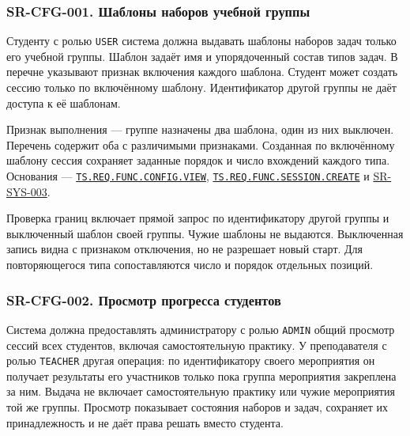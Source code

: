 \documentclass[12pt,a4paper]{article}
\begin{document}
\subsubsection{SR-CFG-001. Шаблоны наборов учебной группы}\label{sr-cfg-001-ux448ux430ux431ux43bux43eux43dux44b-ux43dux430ux431ux43eux440ux43eux432-ux443ux447ux435ux431ux43dux43eux439-ux433ux440ux443ux43fux43fux44b}

\hypertarget{sr-cfg-001-шаблоны-наборов-учебной-группы}{}

\hypertarget{sr-cfg-001}{}

Студенту с ролью \texttt{USER} система должна выдавать шаблоны наборов задач только его учебной группы. Шаблон задаёт имя и упорядоченный состав типов задач. В перечне указывают признак включения каждого шаблона. Студент может создать сессию только по включённому шаблону. Идентификатор другой группы не даёт доступа к её шаблонам.

Признак выполнения --- группе назначены два шаблона, один из них выключен. Перечень содержит оба с различимыми признаками. Созданная по включённому шаблону сессия сохраняет заданные порядок и число вхождений каждого типа. Основания --- {\href{../02\_Техническое\_задание/DOC-02\_Техническое\_задание.pdf\#ts-req-func-config-view}{\texttt{TS.\allowbreak{}REQ.\allowbreak{}FUNC.\allowbreak{}CONFIG.\allowbreak{}VIEW}}}, {\href{../02\_Техническое\_задание/DOC-02\_Техническое\_задание.pdf\#ts-req-func-session-create}{\texttt{TS.\allowbreak{}REQ.\allowbreak{}FUNC.\allowbreak{}SESSION.\allowbreak{}CREATE}}} и {\hyperlink{sr-sys-003}{SR-SYS-003}}.

Проверка границ включает прямой запрос по идентификатору другой группы и выключенный шаблон своей группы. Чужие шаблоны не выдаются. Выключенная запись видна с признаком отключения, но не разрешает новый старт. Для повторяющегося типа сопоставляются число и порядок отдельных позиций.

\subsubsection{SR-CFG-002. Просмотр прогресса студентов}\label{sr-cfg-002-ux43fux440ux43eux441ux43cux43eux442ux440-ux43fux440ux43eux433ux440ux435ux441ux441ux430-ux441ux442ux443ux434ux435ux43dux442ux43eux432}

\hypertarget{sr-cfg-002-просмотр-прогресса-студентов}{}

\hypertarget{sr-cfg-002}{}

Система должна предоставлять администратору с ролью \texttt{ADMIN} общий просмотр сессий всех студентов, включая самостоятельную практику. У преподавателя с ролью \texttt{TEACHER} другая операция: по идентификатору своего мероприятия он получает результаты его участников только пока группа мероприятия закреплена за ним. Выдача не включает самостоятельную практику или чужие мероприятия той же группы. Просмотр показывает состояния наборов и задач, сохраняет их принадлежность и не даёт права решать вместо студента.
\end{document}

